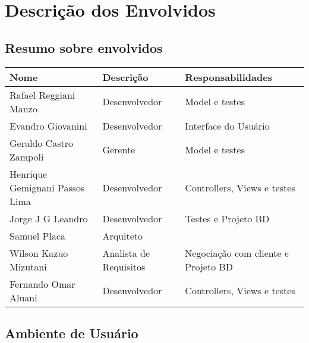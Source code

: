 \documentclass[11pt, a4paper]{article}
\begin{document}
    \section{Descrição dos Envolvidos}

\subsection{Resumo sobre envolvidos}

           \begin{tabular}{| l | l | l|}
                \hline
                Nome & Descrição & Responsabilidades \\ \hline
                Rafael Reggiani Manzo & Desenvolvedor & Model e testes\\  \hline
                Evandro Giovanini & Desenvolvedor & Interface do Usuário\\ \hline
               Geraldo Castro Zampoli  & Gerente & Model e testes\\ \hline
                Henrique Gemignani Passos Lima & Desenvolvedor & Controllers, Views e testes\\ \hline
               Jorge J G Leandro  & Desenvolvedor & Testes e Projeto BD \\  \hline
              Samuel Placa & Arquiteto & \\ \hline
             Wilson Kazuo Mizutani  & Analista de Requisitos & Negociação com cliente e Projeto BD\\ \hline
             Fernando Omar Aluani   & Desenvolvedor & Controllers, Views e testes\\ \hline
                \hline
          \end{tabular}
         
  \subsection{Ambiente de Usuário}
\end{document}
